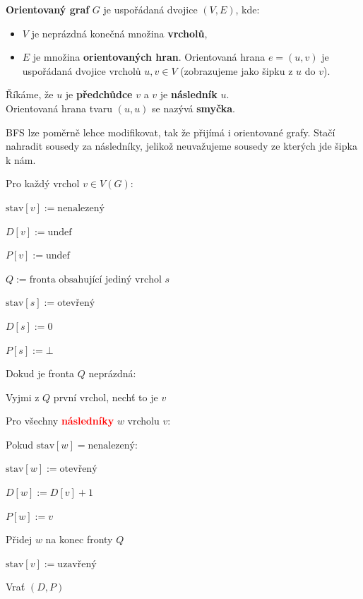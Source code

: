 \begin{definition}
\textbf{Orientovaný graf} $G$ je uspořádaná dvojice $(V, E)$, kde:
\begin{itemize}
    \item $V$ je neprázdná konečná množina \textbf{vrcholů},
    \item $E$ je množina \textbf{orientovaných hran}. Orientovaná hrana $e = (u, v)$ je uspořádaná dvojice vrcholů $u, v \in V$ (zobrazujeme jako šipku z $u$ do $v$).
\end{itemize}
Říkáme, že $u$ je \textbf{předchůdce} $v$ a $v$ je \textbf{následník} $u$. \\
Orientovaná hrana tvaru $(u, u)$ se nazývá \textbf{smyčka}.
\end{definition}

 \bigskip

\noindent BFS lze poměrně lehce modifikovat, tak že přijímá i orientované grafy. Stačí nahradit sousedy za následníky, jelikož neuvažujeme sousedy ze kterých jde šipka k nám. \bigskip

\begin{pseudocode}
\item Pro každý vrchol $v \in V(G)$:
\item \tab $\text{stav}[v] := \text{nenalezený}$
\item \tab $D[v] := \text{undef}$
\item \tab $P[v] := \text{undef}$
\item $Q := \text{fronta obsahující jediný vrchol } s$
\item $\text{stav}[s] := \text{otevřený}$
\item $D[s] := 0$
\item $P[s] := \bot$
\item Dokud je fronta $Q$ neprázdná:
\item \tab Vyjmi z $Q$ první vrchol, nechť to je $v$
\item \tab Pro všechny \textcolor{red}{\textbf{následníky}} $w$ vrcholu $v$:
\item \tab \tab Pokud $\text{stav}[w] = \text{nenalezený}$:
\item \tab \tab \tab $\text{stav}[w] := \text{otevřený}$
\item \tab \tab \tab $D[w] := D[v] + 1$
\item \tab \tab \tab $P[w] := v$
\item \tab \tab \tab Přidej $w$ na konec fronty $Q$
\item \tab $\text{stav}[v] := \text{uzavřený}$
\item Vrať $(D, P)$
\end{pseudocode}
